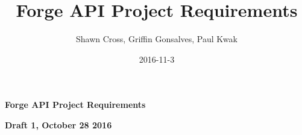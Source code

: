 \documentclass[letterpaper, 10pt, draftclsnofoot, onecolumn]{IEEEtran}
\title{Forge API Project Requirements}
\author{Shawn Cross, Griffin Gonsalves, Paul Kwak}
\date{2016-11-3}
\begin{document}
\clearpage\setcounter{page}{1}\pagestyle{Standard}
\thispagestyle{FirstPage}

\bigskip

{\centering{}\bfseries\color{black}
Forge API Project Requirements
\par}


\bigskip

{\centering{}\bfseries\color{black}
Draft 1, October 28 2016
\par}


\bigskip
\begin{comment}
{\centering\selectlanguage{english}\bfseries\color{black}
FOREWORD
\par}


\bigskip

	{\selectlanguage{english}\color{black}
This document was written to provide software development projects with
a template for generating a System and Software Requirements
Specification (SSRS). \ This document is based on a template originally
written by the U.S. Navy Research, Development, Test and Evaluation
Division in June 1997 in accordance with the MIL-STD-498 DID
(DI-IPSC-81433). \ The template was updated by the University of
Idaho{\textquoteright}s Center for Secure and Dependable Systems (CSDS)
in June 2008 to adhere to IEEE Std. 830-1998, \textit{IEEE Recommended
Practice for Software Requirements
Specifications}\footnote{\foreignlanguage{english}{\ \ \ IEEE Std.
830-1998, }\foreignlanguage{english}{\textit{Recommended Practice for
Software Requirements Specifications}}\foreignlanguage{english}{,
Institute of Electrical and Electronics Engineers, 345 East
47}\foreignlanguage{english}{\textsuperscript{th}}\foreignlanguage{english}{
St. New York, NY, USA, 10017-2394.}}, and IEEE Std. 12207-2008,
\textit{Systems and Software Engineering -- Software Life Cycle
Processes}\footnote{\foreignlanguage{english}{ISO/IEC 12207, IEEE Std.
12207-2008, }\foreignlanguage{english}{\textit{Systems and software
engineering -- Software life cycle
processes}}\foreignlanguage{english}{,
2}\foreignlanguage{english}{\textsuperscript{nd}}\foreignlanguage{english}{
ed., Institute of Electrical and Electronics Engineers, 445 Hoes Lane,
Piscataway, NJ, USA, 08854.}}. It was then adapted in September 2008
for use in UI CS 383.}



\bigskip

{\selectlanguage{english}\color{black}
The SSRS template begins on the next page. \ Just throw away this page
and enter your project specifications into the following template.
\ Don{\textquoteright}t forget to change the headers and footers as
necessary.}


\bigskip


\bigskip




\bigskip

{\selectlanguage{english}\color{black}
[ Text ]\ \ Replace this text with your project specification text.}


\bigskip


\end{comment}
\end{document}
